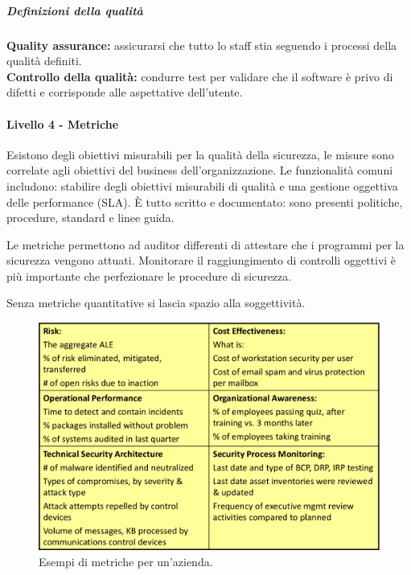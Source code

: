 \subparagraph*{Definizioni della qualità}

\textbf{Quality assurance:} assicurarsi che tutto lo staff stia seguendo i 
processi della qualità definiti.\\
\newline
\textbf{Controllo della qualità:} condurre test per validare che il software è 
privo di difetti e corrisponde alle aspettative dell'utente.

\paragraph{Livello 4 - Metriche}

Esistono degli obiettivi misurabili per la qualità della sicurezza, le misure 
sono correlate agli obiettivi del business dell'organizzazione. Le funzionalità 
comuni includono: stabilire degli obiettivi misurabili di qualità e una gestione
oggettiva delle performance (SLA).
È tutto scritto e documentato: sono presenti politiche, 
procedure, standard e linee guida.


Le metriche permettono ad auditor differenti di attestare che i programmi per 
la sicurezza vengono attuati. Monitorare il raggiungimento di controlli oggettivi 
è più importante che perfezionare le procedure di sicurezza.

Senza metriche quantitative si lascia spazio alla soggettività.

\begin{figure}[h!]
        \begin{center}
                \includegraphics[scale=1.5]{res/img/metriche}
        \end{center}
        \caption{Esempi di metriche per un'azienda.}    
\end{figure}


